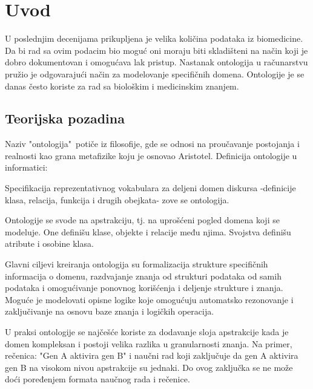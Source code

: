 \section{Uvod}
\label{sec:uvod}

U poslednjim decenijama prikupljena je velika količina podataka iz biomedicine.
Da bi rad sa ovim podacim bio moguć oni moraju biti skladišteni na način koji je
dobro dokumentovan i omogućava lak pristup.
Nastanak ontologija u računarstvu pružio je odgovarajući način za modelovanje specifičnih domena.
Ontologije je se danas često koriste za rad sa biološkim i medicinskim znanjem.

\subsection{Teorijska pozadina}

	Naziv "ontologija"\  potiče iz filosofije, gde se odnosi na proučavanje postojanja i realnosti
kao grana metafizike koju je osnovao Aristotel.
Definicija ontologije u informatici:
\begin{displayquote}
Specifikacija reprezentativnog vokabulara za deljeni domen diskursa
-definicije klasa, relacija, funkcija i drugih obejkata-
zove se ontologija.
\end{displayquote}

Ontologije se svode na apstrakciju, tj. na uprošćeni pogled domena koji se modeluje.
One definišu klase, objekte i relacije među njima. Svojstva definišu atribute i osobine klasa.
\par

Glavni ciljevi kreiranja ontologija su formalizacija strukture specifičnih informacija o domenu,
razdvajanje znanja od strukturi podataka od samih podataka i omogućivanje ponovnog korišćenja 
i deljenje strukture i znanja.
Moguće je modelovati opisne logike koje omogućuju automatsko rezonovanje i zaključivanje
na osnovu baze znanja i logičkih operacija.
\par

U praksi ontologije se najčešće koriste za dodavanje sloja apstrakcije
kada je domen kompleksan i postoji velika razlika u granularnosti znanja.
Na primer, rečenica: "Gen A aktivira gen B" i naučni rad koji zaključuje da gen A
aktivira gen B na visokom nivou apstrakcije su jednaki. Do ovog zaključka se ne može
doći poređenjem  formata naučnog rada i rečenice.
